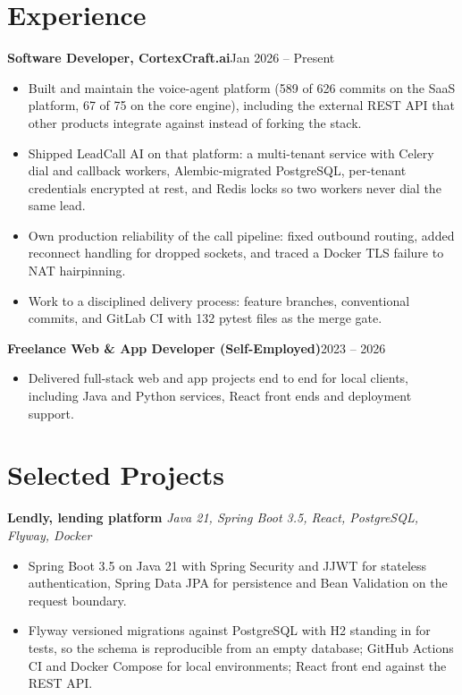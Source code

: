 \documentclass[10pt,a4paper]{article}
\newcommand{\entry}[2]{\textbf{#1}\hfill{#2}\par}
\begin{document}
\section{Experience}
\entry{Software Developer, CortexCraft.ai}{Jan 2026 -- Present}
\begin{itemize}
  \item Built and maintain the voice-agent platform (589 of 626 commits on the SaaS platform, 67 of 75
        on the core engine), including the external REST API that other products integrate against
        instead of forking the stack.
  \item Shipped LeadCall AI on that platform: a multi-tenant service with Celery dial and callback
        workers, Alembic-migrated PostgreSQL, per-tenant credentials encrypted at rest, and Redis
        locks so two workers never dial the same lead.
  \item Own production reliability of the call pipeline: fixed outbound routing, added reconnect
        handling for dropped sockets, and traced a Docker TLS failure to NAT hairpinning.
  \item Work to a disciplined delivery process: feature branches, conventional commits, and GitLab CI
        with 132 pytest files as the merge gate.
\end{itemize}

\vspace{1pt}
\entry{Freelance Web \& App Developer (Self-Employed)}{2023 -- 2026}
\begin{itemize}
  \item Delivered full-stack web and app projects end to end for local clients, including Java and Python services, React front ends and deployment support.
\end{itemize}

\section{Selected Projects}
\textbf{Lendly, lending platform} \textit{Java 21, Spring Boot 3.5, React, PostgreSQL, Flyway, Docker}
\begin{itemize}
  \item Spring Boot 3.5 on Java 21 with Spring Security and JJWT for stateless authentication, Spring
        Data JPA for persistence and Bean Validation on the request boundary.
  \item Flyway versioned migrations against PostgreSQL with H2 standing in for tests, so the schema is
        reproducible from an empty database; GitHub Actions CI and Docker Compose for local
        environments; React front end against the REST API.
\end{itemize}
\end{document}
